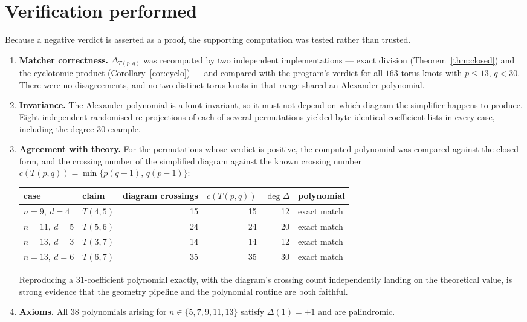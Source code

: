 \documentclass[11pt]{article}
\theoremstyle{definition}
\newcommand{\Deltaa}{\Delta}
\newcommand{\T}[2]{T(#1,#2)}
\begin{document}
\section{Verification performed}\label{sec:evidence}

Because a negative verdict is asserted as a proof, the supporting computation was
tested rather than trusted.

\begin{enumerate}
\item \textbf{Matcher correctness.} $\Deltaa_{\T{p}{q}}$ was recomputed by two
independent implementations --- exact division (Theorem~\ref{thm:closed}) and the
cyclotomic product (Corollary~\ref{cor:cyclo}) --- and compared with the program's
verdict for all $163$ torus knots with $p\le13$, $q<30$. There were no disagreements,
and no two distinct torus knots in that range shared an Alexander polynomial.

\item \textbf{Invariance.} The Alexander polynomial is a knot invariant, so it must not
depend on which diagram the simplifier happens to produce. Eight independent randomised
re-projections of each of several permutations yielded byte-identical coefficient lists
in every case, including the degree-$30$ example.

\item \textbf{Agreement with theory.} For the permutations whose verdict is positive,
the computed polynomial was compared against the closed form, and the crossing number of
the simplified diagram against the known crossing number
$c(\T{p}{q}) = \min\{p(q-1),\,q(p-1)\}$:

\begin{center}
\begin{tabular}{@{}llrrrl@{}}
\toprule
case & claim & diagram crossings & $c(\T{p}{q})$ & $\deg\Deltaa$ & polynomial \\
\midrule
$n=9,\ d=4$  & $\T{4}{5}$ & 15 & 15 & 12 & exact match \\
$n=11,\ d=5$ & $\T{5}{6}$ & 24 & 24 & 20 & exact match \\
$n=13,\ d=3$ & $\T{3}{7}$ & 14 & 14 & 12 & exact match \\
$n=13,\ d=6$ & $\T{6}{7}$ & 35 & 35 & 30 & exact match \\
\bottomrule
\end{tabular}
\end{center}

Reproducing a $31$-coefficient polynomial exactly, with the diagram's crossing count
independently landing on the theoretical value, is strong evidence that the geometry
pipeline and the polynomial routine are both faithful.

\item \textbf{Axioms.} All $38$ polynomials arising for $n\in\{5,7,9,11,13\}$ satisfy
$\Deltaa(1)=\pm1$ and are palindromic.
\end{enumerate}
\end{document}
